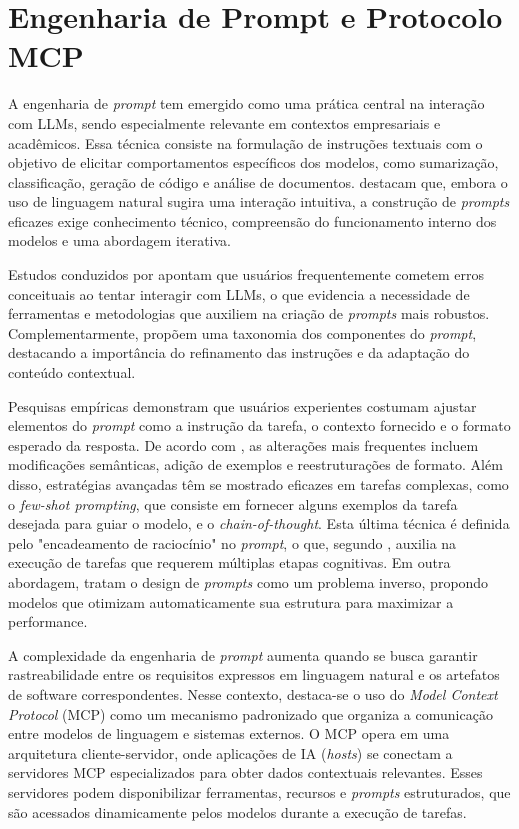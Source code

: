 \section{Engenharia de Prompt e Protocolo MCP}

A engenharia de \textit{prompt} tem emergido como uma prática central na interação com LLMs, sendo especialmente relevante em contextos empresariais e acadêmicos. Essa técnica consiste na formulação de instruções textuais com o objetivo de elicitar comportamentos específicos dos modelos, como sumarização, classificação, geração de código e análise de documentos.  destacam que, embora o uso de linguagem natural sugira uma interação intuitiva, a construção de \textit{prompts} eficazes exige conhecimento técnico, compreensão do funcionamento interno dos modelos e uma abordagem iterativa.

Estudos conduzidos por  apontam que usuários frequentemente cometem erros conceituais ao tentar interagir com LLMs, o que evidencia a necessidade de ferramentas e metodologias que auxiliem na criação de \textit{prompts} mais robustos. Complementarmente,  propõem uma taxonomia dos componentes do \textit{prompt}, destacando a importância do refinamento das instruções e da adaptação do conteúdo contextual.

Pesquisas empíricas demonstram que usuários experientes costumam ajustar elementos do \textit{prompt} como a instrução da tarefa, o contexto fornecido e o formato esperado da resposta. De acordo com , as alterações mais frequentes incluem modificações semânticas, adição de exemplos e reestruturações de formato. Além disso, estratégias avançadas têm se mostrado eficazes em tarefas complexas, como o \textit{few-shot prompting}, que consiste em fornecer alguns exemplos da tarefa desejada para guiar o modelo, e o \textit{chain-of-thought}. Esta última técnica é definida pelo "encadeamento de raciocínio" no \textit{prompt}, o que, segundo , auxilia na execução de tarefas que requerem múltiplas etapas cognitivas. Em outra abordagem,  tratam o design de \textit{prompts} como um problema inverso, propondo modelos que otimizam automaticamente sua estrutura para maximizar a performance.

A complexidade da engenharia de \textit{prompt} aumenta quando se busca garantir rastreabilidade entre os requisitos expressos em linguagem natural e os artefatos de software correspondentes. Nesse contexto, destaca-se o uso do \textit{Model Context Protocol} (MCP) como um mecanismo padronizado que organiza a comunicação entre modelos de linguagem e sistemas externos. O MCP opera em uma arquitetura cliente-servidor, onde aplicações de IA (\textit{hosts}) se conectam a servidores MCP especializados para obter dados contextuais relevantes. Esses servidores podem disponibilizar ferramentas, recursos e \textit{prompts} estruturados, que são acessados dinamicamente pelos modelos durante a execução de tarefas.

